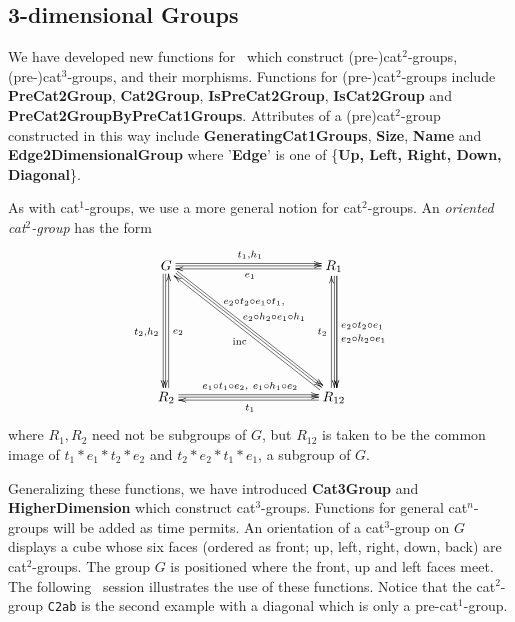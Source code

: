 \documentclass[a4paper,11pt]{article}
\theoremstyle{plain}
\theoremstyle{definition}
\begin{document}
\subsection{3-dimensional Groups}

We have developed new functions for \XMod\ which construct 
(pre-)cat$^{2}$-groups, (pre-)cat$^{3}$-groups, and their morphisms. 
Functions for (pre-)cat$^{2} $-groups include \textbf{PreCat2Group},
\textbf{Cat2Group}, \textbf{IsPreCat2Group}, \textbf{IsCat2Group} 
and \textbf{PreCat2GroupByPreCat1Groups}. 
Attributes of a (pre)cat$^{2}$-group constructed in this way include 
\textbf{GeneratingCat1Groups}, \textbf{Size}, \textbf{Name} and 
\textbf{Edge2DimensionalGroup} where '\textbf{Edge}' is one of 
\{\textbf{Up, Left, Right, Down, Diagonal}\}.  

As with cat$^1$-groups, we use a more general notion for cat$^2$-groups. 
An \emph{oriented cat$^2$-group} has the form 
\[
\xymatrix@R=80pt@C=100pt 
{ G \ar@<+0.5ex>[r]^{t_1,h_1} \ar@<+0.1ex>[r] 
    \ar@<-0.5ex>[d]_{t_2,h_2} \ar@<-0.1ex>[d] 
    \ar@<+0.5ex>[rd]^(0.35){e_2 \circ t_2 \circ e_1 \circ t_1,} 
    \ar@<+0.1ex>[rd]^(0.45){\ e_2 \circ h_2 \circ e_1 \circ h_1} 
	& R_1 \ar@<+0.5ex>[d]^(0.45){e_2 \circ t_2 \circ e_1} 
	      \ar@<+0.5ex>[d]^(0.55){e_2 \circ h_2 \circ e_1} 
	      \ar@<+0.1ex>[d] 
	      \ar@<+0.4ex>[l]^{e_1} \\
  R_2 \ar@<+0.5ex>[r]^{e_1 \circ t_1 \circ e_2,~ e_1 \circ h_1 \circ e_2} 
      \ar@<+0.1ex>[r] 
      \ar@<-0.4ex>[u]_{e_2} 
	& R_{12} \ar@<+0.4ex>[l]^{t_1} \ar@<+0.4ex>[u]^{t_2} 
	         \ar@<+0.4ex>[ul]^{{\rm inc}} 
}
\]
where $R_1, R_2$ need not be subgroups of $G$, 
but $R_{12}$ is taken to be the common image of 
$t_1*e_1*t_2*e_2$ and $t_2*e_2*t_1*e_1$, a subgroup of $G$. 


Generalizing these functions, we have introduced \textbf{Cat3Group} and \textbf{HigherDimension} which construct cat$^{3}$-groups. 
Functions for general cat$^{n}$-groups will be added as time permits. 
An orientation of a cat$^{3}$-group on $G$ displays a cube whose six faces 
(ordered as front; up, left, right, down, back) are cat$^{2}$-groups. 
The group $G$ is positioned where the front, up and left faces meet. 
The following \GAP\ session illustrates the use of these functions. 
Notice that the cat$^2$-group \verb|C2ab| is the second example 
with a diagonal which is only a pre-cat$^1$-group. 
\end{document}
